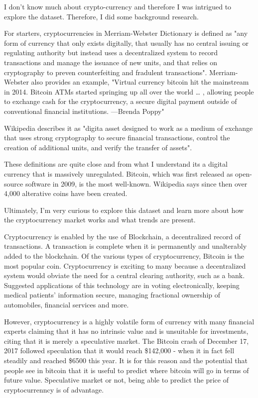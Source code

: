 \documentclass[11pt]{article}
\begin{document}
I don't know much about crypto-currency and therefore I was intrigued to
explore the dataset. Therefore, I did some background research.

For starters, cryptocurrencies in Merriam-Webster Dictionary is defined
as "any form of currency that only exists digitally, that usually has no
central issuing or regulating authority but instead uses a decentralized
system to record transactions and manage the issuance of new units, and
that relies on cryptography to preven counterfeiting and fradulent
transactions". Merriam-Webster also provides an example, "Virtual
currency bitcoin hit the mainstream in 2014. Bitcoin ATMs started
springing up all over the world \ldots{} , allowing people to exchange
cash for the cryptocurrency, a secure digital payment outside of
conventional financial institutions. ---Brenda Poppy"

Wikipedia describes it as "digita asset designed to work as a medium of
exchange that uses strong cryptography to secure financial transactions,
control the creation of additional units, and verify the transfer of
assets".

These definitions are quite close and from what I understand its a
digital currency that is massively unregulated. Bitcoin, which was first
released as open-source software in 2009, is the most well-known.
Wikipedia says since then over 4,000 alterative coins have been created.

Ultimately, I'm very curious to explore this dataset and learn more
about how the cryptocurrency market works and what trends are present.

Cryptocurrency is enabled by the use of Blockchain, a decentralized
record of transactions. A transaction is complete when it is permanently
and unalterably added to the blockchain. Of the various types of
cryptocurrency, Bitcoin is the most popular coin. Cryptocurrency is
exciting to many because a decentralized system would obviate the need
for a central clearing authority, such as a bank. Suggested applications
of this technology are in voting electronically, keeping medical
patients' information secure, managing fractional ownership of
automobiles, financial services and more.

However, cryptocurrency is a highly volatile form of currency with many
financial experts claiming that it has no intrinsic value and is
unsuitable for investments, citing that it is merely a speculative
market. The Bitcoin crash of December 17, 2017 followed speculation that
it would reach \$142,000 - when it in fact fell steadily and reached
\$6500 this year. It is for this reason and the potential that people
see in bitcoin that it is useful to predict where bitcoin will go in
terms of future value. Speculative market or not, being able to predict
the price of cryptocurrenncy is of advantage.
\end{document}
